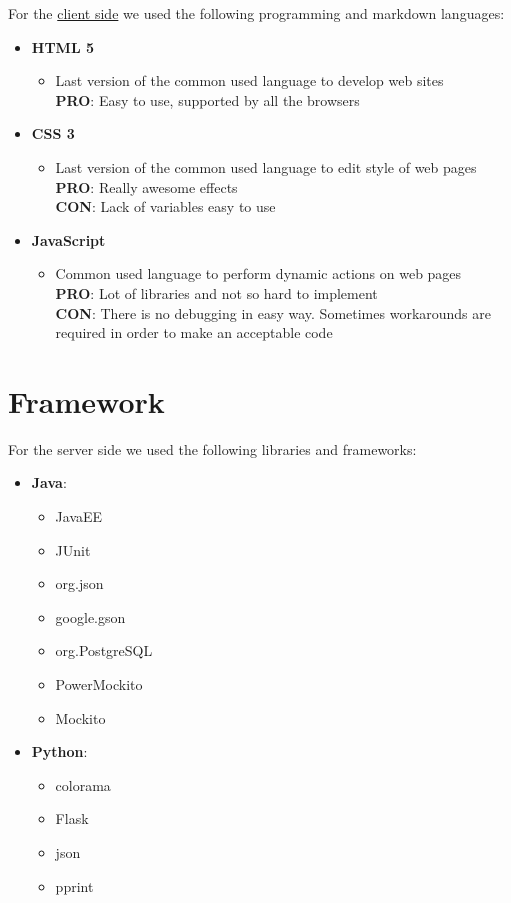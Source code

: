 \documentclass[numbers=noenddot, 12pt, a4paper, oneside]{scrbook}
\begin{document}
For the \underline{client side} we used the following programming and markdown languages:
\begin{itemize}
	\item \textbf{HTML 5}
	\begin{itemize}
		\item Last version of the common used language to develop web sites\\
		\textbf{PRO}: Easy to use, supported by all the browsers\\
	\end{itemize}
	\item \textbf{CSS 3}
	\begin{itemize}
		\item Last version of the common used language to edit style of web pages\\
		\textbf{PRO}: Really awesome effects\\
		\textbf{CON}: Lack of variables easy to use\\
	\end{itemize}
	\item \textbf{JavaScript}
	\begin{itemize}
		\item Common used language to perform dynamic actions on web pages\\
		\textbf{PRO}: Lot of libraries and not so hard to implement\\
		\textbf{CON}: There is no debugging in easy way. Sometimes workarounds are required in order to make an acceptable code
		\\
	\end{itemize}
\end{itemize}


\section*{Framework}

For the server side we used the following libraries and frameworks:
\begin{itemize}
	\item \textbf{Java}:
	\begin{itemize}
		\item JavaEE
		\item JUnit
		\item org.json
		\item google.gson
		\item org.PostgreSQL
		\item PowerMockito
		\item Mockito
	\end{itemize}
	\item \textbf{Python}:
	\begin{itemize}
		\item colorama
		\item Flask
		\item json
		\item pprint
	\end{itemize}
\end{itemize}
\end{document}
